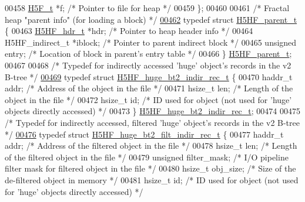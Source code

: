 \begin{DoxyCode}
00458     \hyperlink{struct_h5_f__t}{H5F\_t}      *f;              \textcolor{comment}{/* Pointer to file for heap */}
00459 \};
00460 
00461 \textcolor{comment}{/* Fractal heap "parent info" (for loading a block) */}
\hyperlink{struct_h5_h_f__parent__t}{00462} \textcolor{keyword}{typedef} \textcolor{keyword}{struct }\hyperlink{struct_h5_h_f__parent__t}{H5HF\_parent\_t} \{
00463     \hyperlink{struct_h5_h_f__hdr__t}{H5HF\_hdr\_t} *hdr;                \textcolor{comment}{/* Pointer to heap header info */}
00464     H5HF\_indirect\_t *iblock;    \textcolor{comment}{/* Pointer to parent indirect block */}
00465     \textcolor{keywordtype}{unsigned} entry;             \textcolor{comment}{/* Location of block in parent's entry table */}
00466 \} \hyperlink{struct_h5_h_f__parent__t}{H5HF\_parent\_t};
00467 
00468 \textcolor{comment}{/* Typedef for indirectly accessed 'huge' object's records in the v2 B-tree */}
\hyperlink{struct_h5_h_f__huge__bt2__indir__rec__t}{00469} \textcolor{keyword}{typedef} \textcolor{keyword}{struct }\hyperlink{struct_h5_h_f__huge__bt2__indir__rec__t}{H5HF\_huge\_bt2\_indir\_rec\_t} \{
00470     haddr\_t addr;       \textcolor{comment}{/* Address of the object in the file */}
00471     hsize\_t len;        \textcolor{comment}{/* Length of the object in the file */}
00472     hsize\_t id;         \textcolor{comment}{/* ID used for object (not used for 'huge' objects directly accessed) */}
00473 \} \hyperlink{struct_h5_h_f__huge__bt2__indir__rec__t}{H5HF\_huge\_bt2\_indir\_rec\_t};
00474 
00475 \textcolor{comment}{/* Typedef for indirectly accessed, filtered 'huge' object's records in the v2 B-tree */}
\hyperlink{struct_h5_h_f__huge__bt2__filt__indir__rec__t}{00476} \textcolor{keyword}{typedef} \textcolor{keyword}{struct }\hyperlink{struct_h5_h_f__huge__bt2__filt__indir__rec__t}{H5HF\_huge\_bt2\_filt\_indir\_rec\_t} \{
00477     haddr\_t addr;       \textcolor{comment}{/* Address of the filtered object in the file */}
00478     hsize\_t len;        \textcolor{comment}{/* Length of the filtered object in the file */}
00479     \textcolor{keywordtype}{unsigned} filter\_mask;   \textcolor{comment}{/* I/O pipeline filter mask for filtered object in the file */}
00480     hsize\_t obj\_size;   \textcolor{comment}{/* Size of the de-filtered object in memory */}
00481     hsize\_t id;         \textcolor{comment}{/* ID used for object (not used for 'huge' objects directly accessed) */}

\end{DoxyCode}
